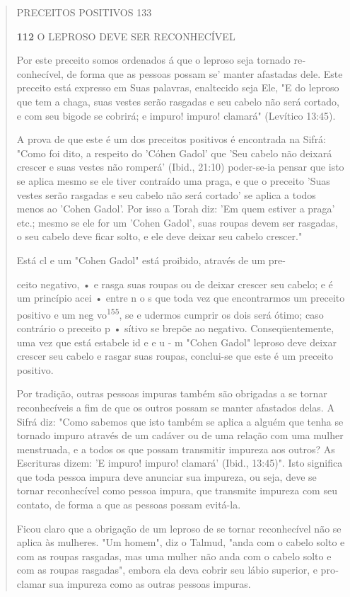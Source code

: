 \begin{quote}
PRECEITOS POSITIVOS 133

\textbf{112} O LEPROSO DEVE SER RECONHECÍVEL

Por este preceito somos ordenados á que o leproso seja tornado
re­conhecível, de forma que as pessoas possam se' manter afastadas dele.
Este pre­ceito está expresso em Suas palavras, enaltecido seja Ele, "E
do leproso que tem a chaga, suas vestes serão rasgadas e seu cabelo não
será cortado, e com seu bigode se cobrirá; e impuro! impuro! clamará"
(Levítico 13:45).

A prova de que este é um dos preceitos positivos é encontrada na Sifrá:
"Como foi dito, a respeito do 'Cóhen Gadol' que 'Seu cabelo não deixará
crescer e suas vestes não romperá' (Ibid., 21:10) poder-se-ia pensar que
isto se aplica mesmo se ele tiver contraído uma praga, e que o preceito
'Suas vestes serão rasgadas e seu cabelo não será cortado' se aplica a
todos menos ao 'Co­hen Gadol'. Por isso a Torah diz: 'Em quem estiver a
praga' etc.; mesmo se ele for um 'Cohen Gadol', suas roupas devem ser
rasgadas, o seu cabelo deve ficar solto, e ele deve deixar seu cabelo
crescer."

Está cl e um "Cohen Gadol" está proibido, através de um pre-

ceito negativo, • e rasga suas roupas ou de deixar crescer seu cabelo; e
é um princípio acei • entre n o s que toda vez que encontrarmos um
preceito positi­vo e um neg vo\textsuperscript{155}, se e udermos
cumprir os dois será ótimo; caso contrário o preceito p • sítivo se
brepõe ao negativo. Conseqüentemente, uma vez que está estabele id e e u
- m "Cohen Gadol" leproso deve deixar crescer seu ca­belo e rasgar suas
roupas, conclui-se que este é um preceito positivo.

Por tradição, outras pessoas impuras também são obrigadas a se tor­nar
reconhecíveis a fim de que os outros possam se manter afastados delas. A
Sifrá diz: "Como sabemos que isto também se aplica a alguém que tenha se
tor­nado impuro através de um cadáver ou de uma relação com uma mulher
mens­truada, e a todos os que possam transmitir impureza aos outros? As
Escrituras dizem: 'E impuro! impuro! clamará' (Ibid., 13:45)". Isto
significa que toda pes­soa impura deve anunciar sua impureza, ou seja,
deve se tornar reconhecível como pessoa impura, que transmite impureza
com seu contato, de forma a que as pessoas possam evitá-la.

Ficou claro que a obrigação de um leproso de se tornar reconhecí­vel não
se aplica às mulheres. "Um homem", diz o Talmud, "anda com o cabe­lo
solto e com as roupas rasgadas, mas uma mulher não anda com o cabelo
sol­to e com as roupas rasgadas", embora ela deva cobrir seu lábio
superior, e pro­clamar sua impureza como as outras pessoas impuras.


\end{quote}
